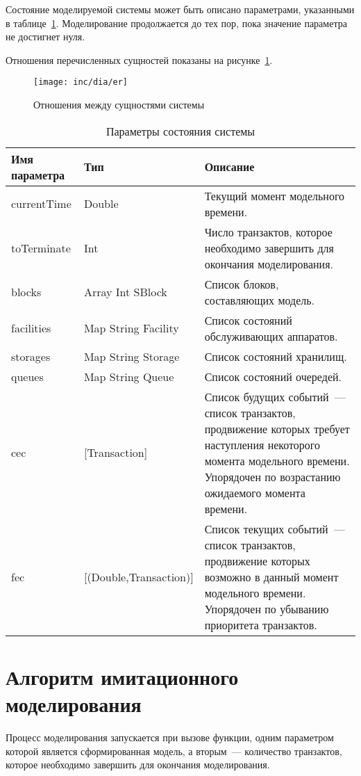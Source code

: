 Состояние моделируемой системы может быть описано параметрами, указанными в таблице~\ref{tab:simState}. Моделирование продолжается до тех пор, пока значение параметра  не достигнет нуля.

Отношения перечисленных сущностей показаны на рисунке~\ref{fig:umlSim}.

\begin{figure}[ht]
  \centering
  \texttt{[image: inc/dia/er]}
  \caption{Отношения между сущностями системы}
  \label{fig:umlSim}
\end{figure}


\begin{table}[ht!]
\caption{Параметры состояния системы}
\label{tab:simState}
\begin{tabular}{|l|l|p{}|}
\hline
Имя параметра & Тип & Описание \\
\hline
currentTime & Double & Текущий момент модельного времени.\\
\hline
toTerminate & Int & Число транзактов, которое необходимо завершить для окончания моделирования.\\
\hline
blocks & Array Int SBlock & Список блоков, составляющих модель.\\
\hline
facilities & Map String Facility & Список состояний обслуживающих аппаратов.\\
\hline
storages & Map String Storage & Список состояний хранилищ.\\
\hline
queues & Map String Queue & Список состояний очередей.\\
\hline
cec & [Transaction] & Список будущих событий~--- список транзактов, продвижение которых требует наступления некоторого момента модельного времени. Упорядочен по возрастанию ожидаемого момента времени. \\
\hline
fec & [(Double,Transaction)] & Список текущих событий~--- список транзактов, продвижение которых возможно в данный момент модельного времени. Упорядочен по убыванию приоритета транзактов. \\
\hline
\end{tabular}
\end{table}


\section{Алгоритм имитационного моделирования}

Процесс моделирования запускается при вызове функции, одним параметром которой является сформированная модель, а вторым~--- количество транзактов, которое необходимо завершить для окончания моделирования.

